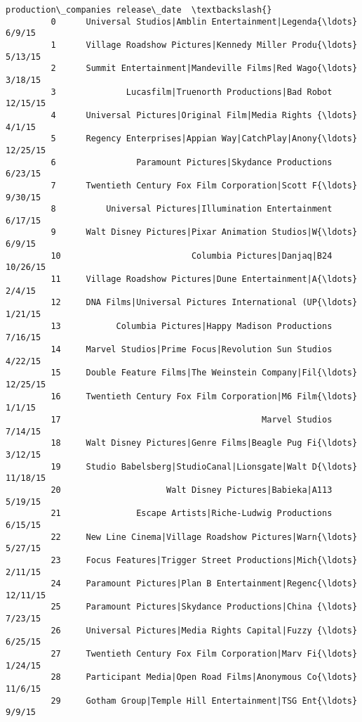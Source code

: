 \documentclass[11pt]{article}
\begin{document}
\begin{Verbatim}[commandchars=\\\{\}]
                                             production\_companies release\_date  \textbackslash{}
         0      Universal Studios|Amblin Entertainment|Legenda{\ldots}       6/9/15   
         1      Village Roadshow Pictures|Kennedy Miller Produ{\ldots}      5/13/15   
         2      Summit Entertainment|Mandeville Films|Red Wago{\ldots}      3/18/15   
         3              Lucasfilm|Truenorth Productions|Bad Robot     12/15/15   
         4      Universal Pictures|Original Film|Media Rights {\ldots}       4/1/15   
         5      Regency Enterprises|Appian Way|CatchPlay|Anony{\ldots}     12/25/15   
         6                Paramount Pictures|Skydance Productions      6/23/15   
         7      Twentieth Century Fox Film Corporation|Scott F{\ldots}      9/30/15   
         8          Universal Pictures|Illumination Entertainment      6/17/15   
         9      Walt Disney Pictures|Pixar Animation Studios|W{\ldots}       6/9/15   
         10                          Columbia Pictures|Danjaq|B24     10/26/15   
         11     Village Roadshow Pictures|Dune Entertainment|A{\ldots}       2/4/15   
         12     DNA Films|Universal Pictures International (UP{\ldots}      1/21/15   
         13           Columbia Pictures|Happy Madison Productions      7/16/15   
         14     Marvel Studios|Prime Focus|Revolution Sun Studios      4/22/15   
         15     Double Feature Films|The Weinstein Company|Fil{\ldots}     12/25/15   
         16     Twentieth Century Fox Film Corporation|M6 Film{\ldots}       1/1/15   
         17                                        Marvel Studios      7/14/15   
         18     Walt Disney Pictures|Genre Films|Beagle Pug Fi{\ldots}      3/12/15   
         19     Studio Babelsberg|StudioCanal|Lionsgate|Walt D{\ldots}     11/18/15   
         20                     Walt Disney Pictures|Babieka|A113      5/19/15   
         21               Escape Artists|Riche-Ludwig Productions      6/15/15   
         22     New Line Cinema|Village Roadshow Pictures|Warn{\ldots}      5/27/15   
         23     Focus Features|Trigger Street Productions|Mich{\ldots}      2/11/15   
         24     Paramount Pictures|Plan B Entertainment|Regenc{\ldots}     12/11/15   
         25     Paramount Pictures|Skydance Productions|China {\ldots}      7/23/15   
         26     Universal Pictures|Media Rights Capital|Fuzzy {\ldots}      6/25/15   
         27     Twentieth Century Fox Film Corporation|Marv Fi{\ldots}      1/24/15   
         28     Participant Media|Open Road Films|Anonymous Co{\ldots}      11/6/15   
         29     Gotham Group|Temple Hill Entertainment|TSG Ent{\ldots}       9/9/15   

\end{Verbatim}
\end{document}
